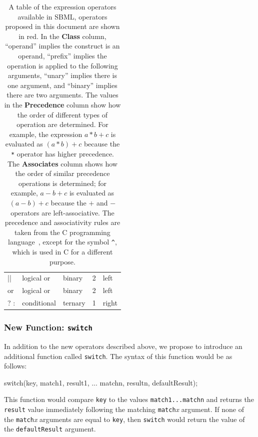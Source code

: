 \documentclass[10pt]{cekarticle}
\begin{document}
\begin{table}[tbh]
\begin{center}
\begin{tabular}{>{\ttfamily}lllcl}
      \color{red} || 	& \color{red} logical or & \color{red} binary & \color{red} 2 & \color{red} left \\
      \color{green} or 	& \color{green} logical or & \color{green} binary & \color{green} 2 & \color{green} left \\
      \color{red} ? : 	& \color{red} conditional & \color{red} ternary & \color{red} 1 & \color{red} right \color{black} \\
      \bottomrule
    \end{tabular}
  \end{center}
  \caption{A table of the expression operators available in SBML,
    operators proposed in this document are shown in red.  In the
    \textbf{\textrm{Class}} column, ``operand'' implies the construct is an
    operand, ``prefix'' implies the operation is applied to the following
    arguments, ``unary'' implies there is one argument, and ``binary''
    implies there are two arguments.  The values in the
    \textbf{\textrm{Precedence}} column show how the order of different
    types of operation are determined.  For example, the expression $a * b
    + c$ is evaluated as $(a * b) + c$ because the \texttt{*} operator has
    higher precedence.  The \textbf{\textrm{Associates}} column shows how
    the order of similar precedence operations is determined; for example,
    $a - b + c$ is evaluated as $(a - b) + c$ because the $+$ and $-$
    operators are left-associative.  The precedence and associativity rules
    are taken from the C programming language~\protect\citep{harbison:1995},
    except for the symbol \texttt{\^}, which is used in C for a different
    purpose.}
  \label{tab:operators}
\end{table}

\subsubsection{New Function: \texttt{switch}}

In addition to the new operators described above, we propose
to introduce an additional function called \texttt{switch}.
The syntax of this function would be as follows:
\begin{example}
switch(key, match1, result1, ... matchn, resultn, defaultResult);
\end{example}

This function would compare \texttt{key} to the values
\texttt{match1...matchn} and returns the \texttt{result} value immediately
following the matching \texttt{match}\textit{x} argument.  If none of the
\texttt{match}\textit{x} arguments are equal to \texttt{key}, then
\texttt{switch} would return the value of the \texttt{defaultResult}
argument.
\end{document}
